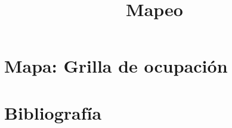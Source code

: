 \documentclass[aspectratio=169,compress]{beamer}
\title{Mapeo}
\author{}
\institute{Universidad Nacional de Rosario}
\date{}
\begin{document}
	
	\frame{\titlepage}
	
	\section{Mapa: Grilla de ocupación}
	
	
	\section{Bibliografía}
	
	
\end{document}
